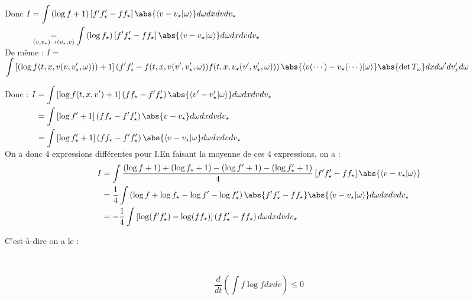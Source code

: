 \documentclass[12pt,a4paper]{article}
\begin{document}
	Donc $\begin{aligned}[t]
		I 
		&= \displaystyle\int \left(\log f + 1\right)\left[f'f_\star'-ff_\star\right] \abs{\langle v-v_\star|\omega\rangle} d\omega dx dv dv_\star\\
		&\underset{(v,v_\star)\to(v_\star,v)}= \int \left(\log f_\star\right)\left[f'f'_\star-ff_\star\right]\abs{\langle v-v_\star|\omega\rangle}d\omega dx dv dv_\star
	\end{aligned}$\\
	
	De même : $I =$\\
	\hspace*{-1cm}$\displaystyle\int \left[\left(\log f(t,x,v(v,v_\star',\omega))\right)+1\right]\left(f'f'_\star-f(t,x,v(v',v_\star',\omega))f(t,x,v_\star(v',v_\star',\omega))\right)\abs{\langle v(\cdots)-v_\star(\cdots)|\omega\rangle} \abs{\det T_\omega}dxd\omega'dv_x'd\omega$
	
	Donc : $\begin{aligned}[t]
		I 
		&= \displaystyle\int \left[\log f(t,x,v')+1\right]\left(ff_\star-f'f_\star'\right)\abs{\langle v'-v'_\star|\omega\rangle}d\omega dx dv dv_\star\\
		&=\int \left[\log f' + 1\right]\left(ff_\star-f'f_\star'\right)\abs{v-v_\star}d\omega dx dv dv_\star\\
		&= \displaystyle\int \left[\log f'_\star + 1\right]\left(ff_\star - f'f_\star'\right)\abs{\langle v-v_\star|\omega}d\omega dx dv dv_\star
	\end{aligned}$\\
	
	On a donc 4 expressions différentes pour I.En faisant la moyenne de ces 4 expressions, on a :
	\[
	\begin{aligned}
		I 
		&= \displaystyle\int \dfrac{\left(\log f +1\right)+\left(\log f_\star + 1\right) - \left(\log f' +1\right)-\left(\log f'_\star + 1\right)}{4}\left[f'f'_\star-ff_\star\right]\abs{\langle v-v_\star|\omega\rangle}\\
		&=  \frac14 \int\left(\log f + \log f_\star - \log f' - \log f'_\star\right)\abs{f'f'_\star-ff_\star}\abs{\langle v-v_\star|\omega\rangle}d\omega dx dv dv_\star \\
		&= -\frac14 \int \left[\log (f'f'_\star)-\log(ff_\star)\right]\left(ff'_\star-ff_\star\right) d\omega dx dv dv_\star 
	\end{aligned}
	\]
	
	C'est-à-dire on a le :
	
	\begin{thm}$ $\\
		\begin{minipage}[t]{18.5cm}
			\[\dfrac d{dt}\left(\displaystyle\int f\log f dx dv\right) \leq 0\]
		\end{minipage}
	\end{thm}
	
\end{document}
